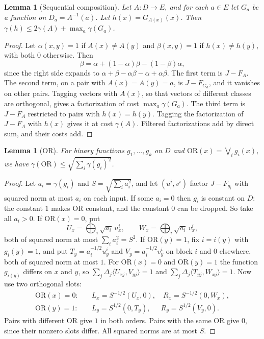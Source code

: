 \documentclass[11pt]{article}
\newtheorem{lemma}[theorem]{Lemma}
\theoremstyle{definition}
\theoremstyle{remark}
\newcommand{\inner}[2]{\langle #1,#2\rangle}
\begin{document}
\begin{lemma}[Sequential composition]\label{lem:seq}
Let $A:D\to E$, and for each $a\in E$ let $G_a$ be a function on $D_a=A^{-1}(a)$. Let $h(x)=G_{A(x)}(x)$. Then $\gamma(h)\le 2\gamma(A)+\max_a\gamma(G_a)$.
\end{lemma}
\begin{proof}
Let $\alpha(x,y)=1$ if $A(x)\ne A(y)$ and $\beta(x,y)=1$ if $h(x)\ne h(y)$, with both $0$ otherwise. Then
\[
\beta=\alpha+(1-\alpha)\beta-(1-\beta)\alpha,
\]
since the right side expands to $\alpha+\beta-\alpha\beta-\alpha+\alpha\beta$. The first term is $J-F_A$. The second term, on a pair with $A(x)=A(y)=a$, is $J-F_{G_a}$, and it vanishes on other pairs. Tagging vectors with $A(x)$, so that vectors of different classes are orthogonal, gives a factorization of cost $\max_a\gamma(G_a)$. The third term is $J-F_A$ restricted to pairs with $h(x)=h(y)$. Tagging the factorization of $J-F_A$ with $h(x)$ gives it at cost $\gamma(A)$. Filtered factorizations add by direct sum, and their costs add.
\end{proof}

\begin{lemma}[OR]\label{lem:or}
For binary functions $g_1,\dots,g_k$ on $D$ and $\mathrm{OR}(x)=\bigvee_i g_i(x)$, we have $\gamma(\mathrm{OR})\le\sqrt{\sum_i\gamma(g_i)^2}$.
\end{lemma}
\begin{proof}
Let $a_i=\gamma(g_i)$ and $S=\sqrt{\sum_i a_i^2}$, and let $(u^i,v^i)$ factor $J-F_{g_i}$ with squared norm at most $a_i$ on each input. If some $a_i=0$ then $g_i$ is constant on $D$: the constant $1$ makes OR constant, and the constant $0$ can be dropped. So take all $a_i>0$. If $\mathrm{OR}(x)=0$, put
\[
U_x=\bigoplus_i\sqrt{a_i}\,u^i_x,\qquad W_x=\bigoplus_i\sqrt{a_i}\,v^i_x,
\]
both of squared norm at most $\sum_i a_i^2=S^2$. If $\mathrm{OR}(y)=1$, fix $i=i(y)$ with $g_i(y)=1$, and put $T_y=a_i^{-1/2}u^i_y$ and $V_y=a_i^{-1/2}v^i_y$ on block $i$ and $0$ elsewhere, both of squared norm at most $1$. For $\mathrm{OR}(x)=0$ and $\mathrm{OR}(y)=1$ the function $g_{i(y)}$ differs on $x$ and $y$, so $\sum_j\Delta_j\inner{U_{xj}}{V_{yj}}=1$ and $\sum_j\Delta_j\inner{T_{yj}}{W_{xj}}=1$. Now use two orthogonal slots:
\begin{align*}
\mathrm{OR}(x)=0:&\quad L_x=S^{-1/2}(U_x,0),\quad R_x=S^{-1/2}(0,W_x),\\
\mathrm{OR}(y)=1:&\quad L_y=S^{1/2}(0,T_y),\quad\ \ R_y=S^{1/2}(V_y,0).
\end{align*}
Pairs with different OR give $1$ in both orders. Pairs with the same OR give $0$, since their nonzero slots differ. All squared norms are at most $S$.
\end{proof}
\end{document}
